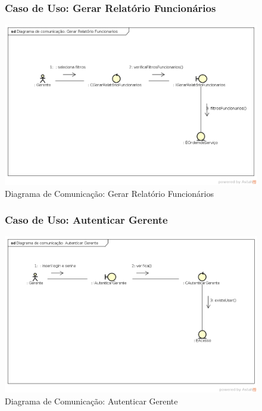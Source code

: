 \documentclass[
	12pt,				%
	openright,
	oneside,			%
	a4paper,			%
	chapter=TITLE,		%
	brazil				%
	]{abntex2}
\begin{document}
\begin{figure}[h!]

\subsubsection*{Caso de Uso: Gerar Relatório Funcionários}


	\caption{Diagrama de Comunicação: Gerar Relatório Funcionários}
	\begin{center}
	    \includegraphics[scale=0.5]{Arquivos/Projeto/C_relatorio_funcionarios}  
	\end{center}
\end{figure}



\begin{figure}[h!]

\subsubsection*{Caso de Uso: Autenticar Gerente}


	\caption{Diagrama de Comunicação: Autenticar Gerente}
	\begin{center}
	    \includegraphics[scale=0.5]{Arquivos/Projeto/C_autenticar_gerente}  
	\end{center}
\end{figure}
\end{document}
